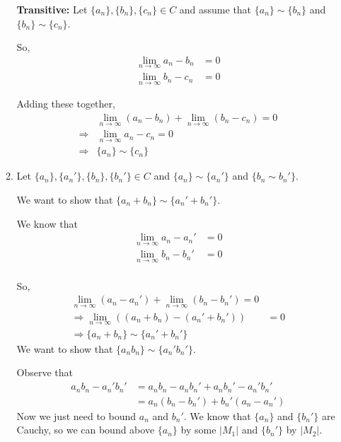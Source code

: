 \documentclass[12pt]{article}
\begin{document}
\begin{enumerate}[start=1,label={\bfseries Problem \arabic*:},leftmargin=1in]
\begin{enumerate}
        \textbf{Transitive:} Let $\{a_{n}\}, \{b_{n}\}, \{c_{n}\} \in C$ and assume that $\{a_{n}\} \sim \{b_{n}\}$ and $\{ b_{n} \} \sim \{ c_{n } \}$. 

        So,
        \begin{align*}
            \lim_{n \to \infty} a_{n} - b_{n} &= 0\\ 
            \lim_{n \to \infty} b_{n} - c_{n} &= 0
        \end{align*}

        Adding these together, 
        \begin{align*}
            &\lim_{n \to \infty} (a_{n} - b_{n}) + \lim_{n \to \infty} (b_{n} - c_{n}) = 0 \\ 
            \Rightarrow &\lim_{n \to \infty} a_{n} - c_{n} = 0\\
            \Rightarrow &\{a_{n} \} \sim \{ c_{n} \}
        \end{align*}
            
        \item Let $\{ a_{n} \}, \{ a_{n}' \}, \{ b_{n} \}, \{ b_{n}' \} \in C$ and $\{ a_{n} \} \sim \{a_{n}' \}$ and $\{ b_{n} \sim b_{n}' \}$. 
        
        We want to show that $\{ a_{n} + b_{n} \} \sim \{ a_{n}' + b_{n}' \}$. 

        We know that
        \begin{align*}
            \lim_{n \to \infty} a_{n} - a_{n}' &= 0 \\ 
            \lim_{n \to \infty} b_{n} - b_{n}' &= 0 \\ 
        \end{align*}

        So, 
        \begin{align*}
            \lim_{n \to \infty} (a_{n} - a_{n}') + \lim_{n \to \infty} (b_{n} - b_{n}') = 0\\ 
            \Rightarrow \lim_{n \to \infty} ((a_{n} + b_{n}) - (a_{n}' + b_{n}')) &= 0 \\
            \Rightarrow \{ a_{n} + b_{n} \} \sim \{ a_{n}' + b_{n}' \}
        \end{align*}
        We want to show that $\{ a_{n}b_{n} \} \sim \{ a_{n}'b_{n}'\}$. 

        Observe that 
        \begin{align*}
            a_{n}b_{n} - a_{n}'b_{n}' &= a_{n}b_{n} - a_{n}b_{n}' + a_{n}b_{n}' - a_{n}'b_{n}' \\ 
            &= a_{n}(b_{n} - b_{n}') + b_{n}'(a_{n} - a_{n}')  
        \end{align*}
        Now we just need to bound $a_{n}$ and $b_{n}'$. We know that $\{ a_{n} \}$ and $\{ b_{n}' \}$ 
        are Cauchy, so we can bound above $\{ a_{n} \}$ by some $\left| M_{1} \right|$ and $\{ b_{n}' \}$ by $\left| M_{2} \right| $.


\end{enumerate}
\end{enumerate}
\end{document}

